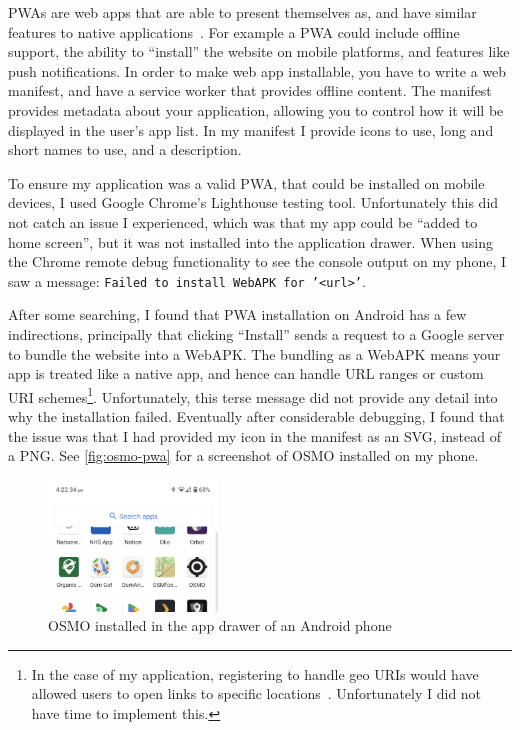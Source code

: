 \documentclass[hyphens]{final_report}
\begin{document}
PWAs are web apps that are able to present themselves as, and have similar features to native applications~\cite{mdn-pwas}. For example a PWA could include offline support, the ability to ``install'' the website on mobile platforms, and features like push notifications. In order to make web app installable, you have to write a web manifest, and have a service worker that provides offline content. The manifest provides metadata about your application, allowing you to control how it will be displayed in the user's app list. In my manifest I provide icons to use, long and short names to use, and a description.

To ensure my application was a valid PWA, that could be installed on mobile devices, I used Google Chrome's Lighthouse testing tool. Unfortunately this did not catch an issue I experienced, which was that my app could be ``added to home screen'', but it was not installed into the application drawer. When using the Chrome remote debug functionality to see the console output on my phone, I saw a message: \texttt{Failed to install WebAPK for '<url>'}. 

After some searching, I found that PWA installation on Android has a few indirections, principally that clicking ``Install'' sends a request to a Google server to bundle the website into a WebAPK\@. The bundling as a WebAPK means your app is treated like a native app, and hence can handle URL ranges or custom URI schemes\footnote{In the case of my application, registering to handle geo URIs would have allowed users to open links to specific locations~\cite{geo-uri-rfc}. Unfortunately I did not have time to implement this.}. Unfortunately, this terse message did not provide any detail into why the installation failed. Eventually after considerable debugging, I found that the issue was that I had provided my icon in the manifest as an SVG, instead of a PNG\@. See \autoref{fig:osmo-pwa} for a screenshot of OSMO installed on my phone.

\begin{figure}[ht]
    \centering
    \includegraphics[width=0.4\textwidth]{images/osmo-pwa.png}
    \caption{OSMO installed in the app drawer of an Android phone}\label{fig:osmo-pwa}
\end{figure}
\end{document}
